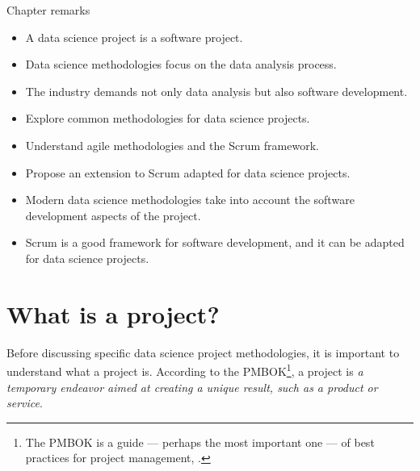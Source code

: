 \begin{mainbox}{Chapter remarks}


  \startcontents[chapters]
  \vspace{1em}


  \begin{itemize}
    \itemsep0em
    \item A data science project is a software project.
    \item Data science methodologies focus on the data analysis process.
    \item The industry demands not only data analysis but also software development.
  \end{itemize}


  \begin{itemize}
    \itemsep0em
    \item Explore common methodologies for data science projects.
    \item Understand agile methodologies and the Scrum framework.
    \item Propose an extension to Scrum adapted for data science projects.
  \end{itemize}


  \begin{itemize}
    \itemsep0em
    \item Modern data science methodologies take into account the software development aspects of the
      project.
    \item Scrum is a good framework for software development, and it can be adapted for
      data science projects.
  \end{itemize}
\end{mainbox}

{}
\clearpage

\section{What is a project?}

Before discussing specific data science project methodologies, it is important to understand
what a project is.  According to the PMBOK\footnote{The PMBOK is a guide --- perhaps the
most important one --- of best practices for project management,
.}, a project is \emph{a temporary endeavor aimed at creating a unique result,
such as a product or service}.

